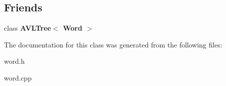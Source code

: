 \subsection*{Friends}
\begin{DoxyCompactItemize}
\item 
\hypertarget{classWord_ad6a142bb05ffab44c3569b143b258ad4}{class {\bfseries A\-V\-L\-Tree$<$ Word $>$}}\label{classWord_ad6a142bb05ffab44c3569b143b258ad4}

\end{DoxyCompactItemize}


The documentation for this class was generated from the following files\-:\begin{DoxyCompactItemize}
\item 
word.\-h\item 
word.\-cpp\end{DoxyCompactItemize}

